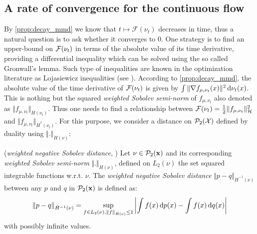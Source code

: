 \subsection{A rate of convergence for the continuous flow}\label{sec:Lojasiewicz_inequality}
By \cref{prop:decay_mmd} we know that $t\mapsto\mathcal{F}(\nu_t)$ decreases in time, thus a natural question is to ask whether it converges to $0$. One strategy is to find an upper-bound on ${{\mathcal F}}(\nu_t)$ in terms of the absolute value of its time derivative, providing a differential inequality which can be solved using the so called Gronwall's lemma. Such type of inequalities are known in the optimization literature as Lojasiewicz inequalities (see \cite{blanchet2018family}).
According to \cref{prop:decay_mmd}, the absolute value of the time derivative of ${{\mathcal F}}(\nu_t)$ is given by $\int \Vert \nabla f_{\mu,\nu_t}(x) \Vert^2 \mathop{}\!\mathrm{d} \nu_t(x)$. This is nothing but the squared \textit{weighted Sobolev semi-norm} of $f_{\mu,\nu_t}$ also denoted as $\Vert f_{\mu,\nu_t} \Vert_{\dot{H}(\nu_t)}$. Thus one needs to find a relationship between ${{\mathcal F}}(\nu_t) = \frac{1}{2} \Vert f_{\mu,\nu_t} \Vert_{\mathcal{H}}^2 $ and $\Vert f_{\mu,\nu_t} \Vert_{\dot{H}^1(\nu_t)}$. For this purpose, we consider a distance on $\mathcal{P}_2({{\mathcal X}})$ defined by duality using $\Vert . \Vert_{\dot{H}(\nu)}$:
\begin{definition}\label{def:neg_sobolev}(\textit{weighted negative Sobolev distance}, \cite{Peyre:2011})
	Let $\nu\in \mathcal{P}_2({\mathbf x})$ and its corresponding \textit{weighted Sobolev semi-norm} $ \Vert . \Vert_{\dot{H}(\nu)} $, defined on $L_2(\nu)$ the set squared integrable functions w.r.t. $\nu$. The \textit{weighted negative Sobolev distance} $\Vert p - q \Vert_{\dot{H}^{-1}(\nu)}$ between any $p$ and $q$ in $\mathcal{P}_2({\mathbf x})$  is defined as:
\begin{align}\label{eq:neg_sobolev}
	\Vert p - q \Vert_{\dot{H}^{-1}(\nu)} = \sup_{f\in L_2(\nu), \Vert f \Vert_{\dot{H}(\nu)} \leq 1 } \left\vert \int f(x)\mathop{}\!\mathrm{d} p(x) - \int f(x)\mathop{}\!\mathrm{d} q(x) \right\vert 
\end{align}	
with possibly infinite values.
\end{definition}
